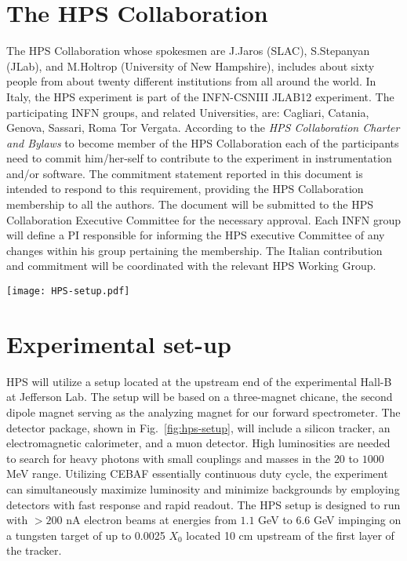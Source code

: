 \documentclass[11pt]{report}
\begin{document}
\section{The HPS Collaboration}
The HPS Collaboration whose spokesmen are J.Jaros (SLAC), S.Stepanyan (JLab), and M.Holtrop (University of New Hampshire), includes about sixty people from about twenty different institutions from all around the world.
In Italy, the HPS experiment is part of the INFN-CSNIII JLAB12 experiment. The participating INFN groups,  and related Universities, are:  Cagliari, Catania, Genova, Sassari, Roma Tor Vergata.
According to the {\it HPS Collaboration Charter and Bylaws} to become member of the HPS Collaboration each of the participants need to commit him/her-self to contribute to the experiment in instrumentation and/or software.
The commitment statement reported in this document is intended to respond to this requirement, providing the HPS Collaboration membership to all the authors. The document will be submitted to the HPS Collaboration Executive Committee
for the necessary approval. Each INFN group will define a PI  responsible for informing the HPS executive Committee of any changes within his group pertaining the membership.
The Italian contribution and commitment will be coordinated  with the relevant HPS Working Group.

\begin{figure*}[t]
\texttt{[image: HPS-setup.pdf]}
\caption{\small{The HPS detector components. From left to right: the target, the silicon tracker in the dipole magnet, the electromagnetic calorimeter ECal and the muon detecor.}}\label{fig:hps-setup}
\end{figure*}

\section{Experimental set-up}
HPS will utilize a setup located at the upstream end of  the experimental Hall-B at Jefferson Lab. The setup will be based on a three-magnet chicane, the second dipole magnet serving as the analyzing magnet for our forward spectrometer. The detector package, shown in Fig.~\ref{fig:hps-setup}, will include a silicon tracker, an electromagnetic calorimeter, and a muon detector. High luminosities are needed to search for heavy photons with small couplings and masses in the $20$ to $1000$ MeV range. Utilizing CEBAF essentially continuous duty cycle, the experiment can simultaneously maximize luminosity and minimize backgrounds by employing detectors with fast response and rapid readout. The HPS setup is designed to run with $> 200$ nA electron beams at energies from $1.1$ GeV to $6.6$ GeV impinging on a tungsten target of up to 0.0025 $X_{0}$ located  10 cm upstream of the first layer of the tracker.
\end{document}
